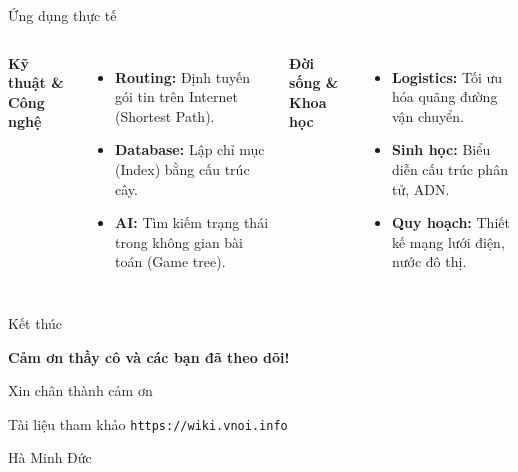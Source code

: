 \documentclass{beamer}
\begin{document}
\begin{frame}{Ứng dụng thực tế}

\begin{columns}

\textbf{Kỹ thuật \& Công nghệ}
\begin{itemize}
\item \textbf{Routing:} Định tuyến gói tin trên Internet (Shortest Path).
\item \textbf{Database:} Lập chỉ mục (Index) bằng cấu trúc cây.
\item \textbf{AI:} Tìm kiếm trạng thái trong không gian bài toán (Game tree).
\end{itemize}

\textbf{Đời sống \& Khoa học}
\begin{itemize}
\item \textbf{Logistics:} Tối ưu hóa quãng đường vận chuyển.
\item \textbf{Sinh học:} Biểu diễn cấu trúc phân tử, ADN.
\item \textbf{Quy hoạch:} Thiết kế mạng lưới điện, nước đô thị.
\end{itemize}

\end{columns}

\end{frame}

\begin{frame}{Kết thúc}

\centering

\vspace{0.8cm}

{\Huge \textbf{Cảm ơn thầy cô và các bạn đã theo dõi!}}

\vspace{1cm}

{\Large Xin chân thành cảm ơn}

\vspace{1.2cm}

\begin{block}{Tài liệu tham khảo}
\centering
\texttt{https://wiki.vnoi.info}
\end{block}

\vfill
{\small Hà Minh Đức}

\end{frame}
\end{document}
